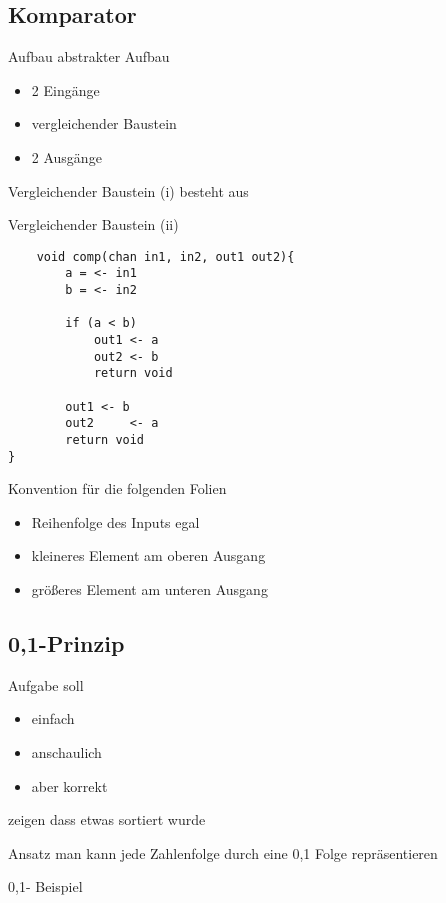 \documentclass[ucs,9pt]{beamer}
\begin{document}
\subsection{Komparator}
\begin{frame}{Aufbau}
abstrakter Aufbau
\begin{itemize}
\item 2 Eingänge
\item vergleichender Baustein
\item 2 Ausgänge
\end{itemize}
\end{frame}
\begin{frame}{Vergleichender Baustein (i)}
besteht aus
\end{frame}
\begin{frame}[fragile]{Vergleichender Baustein (ii)}
\begin{lstlisting}
	void comp(chan in1, in2, out1 out2){
		a = <- in1
		b = <- in2
	
		if (a < b)
			out1 <- a
			out2 <- b
			return void
	
		out1 <- b
		out2	 <- a
		return void
}
\end{lstlisting}
\end{frame}
\begin{frame}
Konvention für die folgenden Folien
\begin{itemize}
\item Reihenfolge des Inputs egal
\item kleineres Element am oberen Ausgang
\item größeres Element am unteren Ausgang
\end{itemize}
\end{frame}
\subsection{0,1-Prinzip}
\begin{frame}{Aufgabe}
soll 
\begin{itemize}
\item einfach
\item anschaulich
\item aber korrekt
\end{itemize}
zeigen dass etwas sortiert wurde
\end{frame}
\begin{frame}{Ansatz}
man kann jede Zahlenfolge durch eine 0,1 Folge repräsentieren
\end{frame}
\begin{frame}{0,1- Beispiel}

\end{frame}
\end{document}
